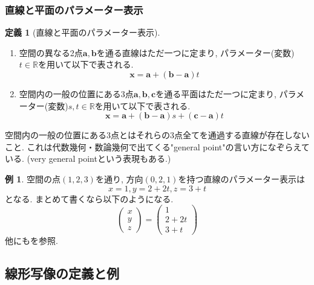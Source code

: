 \documentclass[dvipdfmx,a4paper,11pt]{article} %
\newcommand{\R}{\mathbb{R}}
\theoremstyle{definition}
\newtheorem{dfn}[thm]{定義}
\newtheorem{exa}[thm]{例}
\begin{document}
 
 
 \subsubsection{直線と平面のパラメーター表示}

    \begin{dfn}[直線と平面のパラメーター表示]
\begin{enumerate}

\item 空間の異なる2点$\bm{a}, \bm{b}$を通る直線はただ一つに定まり, パラメーター(変数)$t \in \R$を用いて以下で表される.
$$
\bm{x}
=
\bm{a} + (\bm{b} - \bm{a})t
$$
\item 空間内の一般の位置にある3点$\bm{a}, \bm{b}, \bm{c}$を通る平面はただ一つに定まり, パラメーター(変数)$s, t \in \R$を用いて以下で表される.
$$
\bm{x}
=
\bm{a} + (\bm{b} - \bm{a})s +  (\bm{c} - \bm{a})t
$$
\end{enumerate}
\end{dfn}

空間内の一般の位置にある3点とはそれらの3点全てを通過する直線が存在しないこと. 
これは代数幾何・数論幾何で出てくる"general point"の言い方になぞらえている. (very general pointという表現もある.)


 
 \begin{exa}
空間の点$(1,2,3)$を通り, 方向$(0,2,1)$を持つ直線のパラメーター表示は
$$
x=1, y=2+2t, z=3+t
$$
となる. まとめて書くなら以下のようになる. 
$$
\begin{pmatrix} x\\y\\z\end{pmatrix}
=
\begin{pmatrix} 1\\2+2t\\3+t\end{pmatrix}
$$
他にも\cite[問題 1.1.3-4]{O}を参照. 
 \end{exa}





\subsection{線形写像の定義と例 \cite[1.2節]{O}} 
\label{subsec-1.3}
\end{document}
